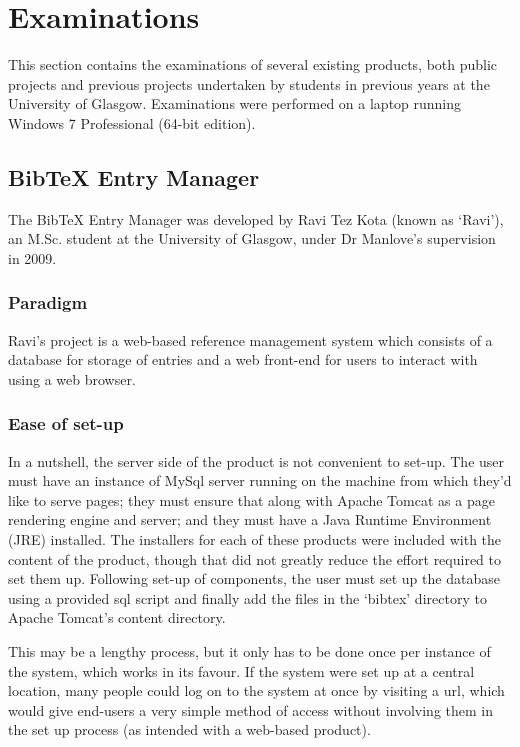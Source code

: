 \documentclass{l4proj}
\newcommand{\BibTeX}{B{\sc ib}\TeX}
\newcommand{\bibtex}{\BibTeX}
\begin{document}
\section{Examinations}
This section contains the examinations of several existing products, both public projects and previous projects undertaken by students in previous years at the University of Glasgow.  Examinations were performed on a laptop running Windows 7 Professional (64-bit edition).

\subsection{\bibtex{} Entry Manager}
The \bibtex{} Entry Manager was developed by Ravi Tez Kota (known as `Ravi'), an M.Sc. student at the University of Glasgow, under Dr Manlove's supervision in 2009.

\subsubsection{Paradigm}
Ravi's project is a web-based reference management system which consists of a database for storage of entries and a web front-end for users to interact with using a web browser.

\subsubsection{Ease of set-up}
In a nutshell, the server side of the product is not convenient to set-up.  The user must have an instance of MySql server running on the machine from which they'd like to serve pages; they must ensure that along with Apache Tomcat as a page rendering engine and server; and they must have a Java Runtime Environment (JRE) installed.  The installers for each of these products were included with the content of the product, though that did not greatly reduce the effort required to set them up.  Following set-up of components, the user must set up the database using a provided \gls{sql} script and finally add the files in the `bibtex' directory to Apache Tomcat's content directory.  

This may be a lengthy process, but it only has to be done once per instance of the system, which works in its favour. If the system were set up at a central location, many people could log on to the system at once by visiting a \gls{url}, which would give end-users a very simple method of access without involving them in the set up process (as intended with a web-based product).
\end{document}
